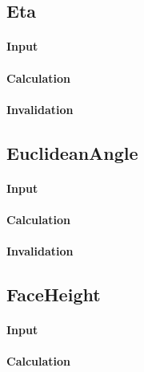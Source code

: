 \bigskip

\subsection{Eta}

\paragraph{Input}

\paragraph{Calculation}

\paragraph{Invalidation}

\bigskip

\subsection{EuclideanAngle}

\paragraph{Input}

\paragraph{Calculation}

\paragraph{Invalidation}

\bigskip

\subsection{FaceHeight}

\paragraph{Input}

\paragraph{Calculation}

